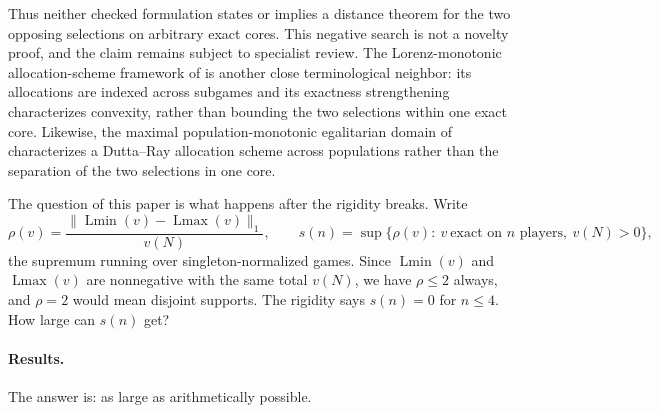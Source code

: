 \documentclass[11pt]{article}
\newcommand{\Lmin}{\operatorname{Lmin}}
\newcommand{\Lmax}{\operatorname{Lmax}}
\begin{document}
Thus neither checked formulation states or implies a distance theorem for the
two opposing selections on arbitrary exact cores.  This negative search is
not a novelty proof, and the claim remains subject to specialist review.
The Lorenz-monotonic allocation-scheme framework of
\citet{IzquierdoMontesRafels2024} is another close terminological neighbor:
its allocations are indexed across subgames and its exactness strengthening
characterizes convexity, rather than bounding the two selections within one
exact core.  Likewise, the maximal population-monotonic egalitarian domain of
\citet{DietzenbacherDogan2025} characterizes a Dutta--Ray allocation scheme
across populations rather than the separation of the two selections in one
core.

The question of this paper is what happens after the rigidity breaks.  Write
\[
 \rho(v)=\frac{\|\Lmin(v)-\Lmax(v)\|_1}{v(N)},
 \qquad
 s(n)=\sup\bigl\{\rho(v):\ v\ \text{exact on $n$ players},\ v(N)>0\bigr\},
\]
the supremum running over singleton-normalized games.
Since $\Lmin(v)$ and $\Lmax(v)$ are nonnegative with the same total $v(N)$,
we have $\rho\le2$ always, and $\rho=2$ would mean disjoint supports.  The
rigidity says $s(n)=0$ for $n\le4$.  How large can $s(n)$ get?

\paragraph{Results.}
The answer is: as large as arithmetically possible.
\end{document}
